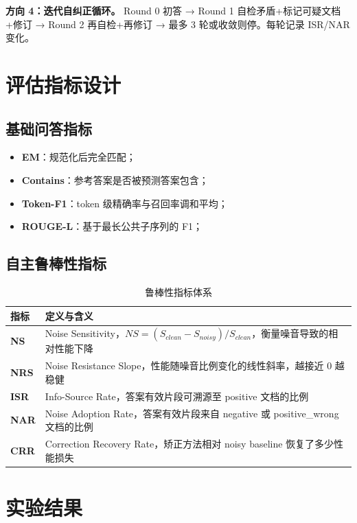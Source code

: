 \documentclass[UTF8,zihao=-4]{ctexart}
\newcommand{\metric}[1]{\textbf{\textcolor{sduBlue}{#1}}}
\begin{document}
\textbf{方向 4：迭代自纠正循环。} Round 0 初答 → Round 1 自检矛盾+标记可疑文档+修订 → Round 2 再自检+再修订 → 最多 3 轮或收敛则停。每轮记录 ISR/NAR 变化。

\section{评估指标设计}

\subsection{基础问答指标}

\begin{itemize}
  \item \metric{EM}：规范化后完全匹配；
  \item \metric{Contains}：参考答案是否被预测答案包含；
  \item \metric{Token-F1}：token 级精确率与召回率调和平均；
  \item \metric{ROUGE-L}：基于最长公共子序列的 F1；
\end{itemize}

\subsection{自主鲁棒性指标}

\begin{table}[H]
  \centering
  \caption{鲁棒性指标体系}
  \begin{tabularx}{\textwidth}{lY}
    \toprule
    指标 & 定义与含义 \\
    \midrule
    \metric{NS} & Noise Sensitivity，$NS=(S_{clean}-S_{noisy})/S_{clean}$，衡量噪音导致的相对性能下降 \\
    \metric{NRS} & Noise Resistance Slope，性能随噪音比例变化的线性斜率，越接近 0 越稳健 \\
    \metric{ISR} & Info-Source Rate，答案有效片段可溯源至 positive 文档的比例 \\
    \metric{NAR} & Noise Adoption Rate，答案有效片段来自 negative 或 positive\_wrong 文档的比例 \\
    \metric{CRR} & Correction Recovery Rate，矫正方法相对 noisy baseline 恢复了多少性能损失 \\
    \bottomrule
  \end{tabularx}
\end{table}

\section{实验结果}
\end{document}

